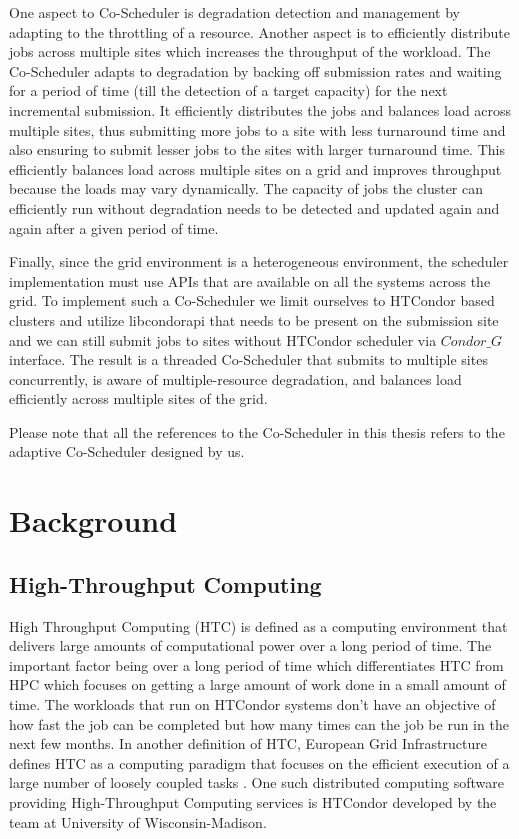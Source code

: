 \documentclass[ms,electronic,double]{nuthesis}
\begin{document}
One aspect to Co-Scheduler is degradation detection and management by adapting 
to the throttling of a resource. Another aspect is to efficiently distribute jobs 
across multiple sites which increases the throughput of the workload. The Co-Scheduler adapts to degradation by backing off submission rates and waiting for a 
period of time (till the detection of a target capacity) for the next incremental submission. It efficiently 
distributes the jobs and balances load across multiple sites, thus submitting more 
jobs to a site with less turnaround time and also ensuring to submit lesser 
jobs to the sites with larger turnaround time. This efficiently balances load 
across multiple sites on a grid and improves throughput because the loads may vary dynamically. 
The capacity of jobs the cluster can efficiently run without degradation needs to be detected and updated again and 
again after a given period of time.

Finally, since the grid environment is a heterogeneous environment, the scheduler implementation must use APIs that are available on all the systems across the grid. To implement such a Co-Scheduler
 we limit ourselves to HTCondor based clusters and utilize libcondorapi that needs to be present on the submission site and we can still submit jobs to sites without HTCondor scheduler via $Condor\_G$ interface. 
 The result is a threaded Co-Scheduler 
that submits to multiple sites concurrently, is aware of multiple-resource degradation, and
balances load efficiently across multiple sites of the grid. 

Please note that all the references to the Co-Scheduler in this thesis refers to the adaptive Co-Scheduler designed 
by us.  

\chapter{Background}

\section{High-Throughput Computing} High Throughput Computing (HTC) is defined as 
a computing environment that delivers large amounts of computational
power over a long period of time. The important factor being over a long period of time which 
differentiates HTC from HPC which focuses on getting a large amount of work done in a small amount of time.
The workloads that run on HTCondor systems don't have an objective of  how fast the job can be completed 
but how many times can the job be run in the next few months. In another definition of HTC, European Grid  
Infrastructure defines HTC as a computing paradigm that focuses on the efficient 
execution of a large number of loosely coupled tasks \cite{manual56}. One such 
distributed computing software providing High-Throughput Computing services is 
HTCondor developed by the team at University of Wisconsin-Madison\cite{manual56}.
\end{document}
